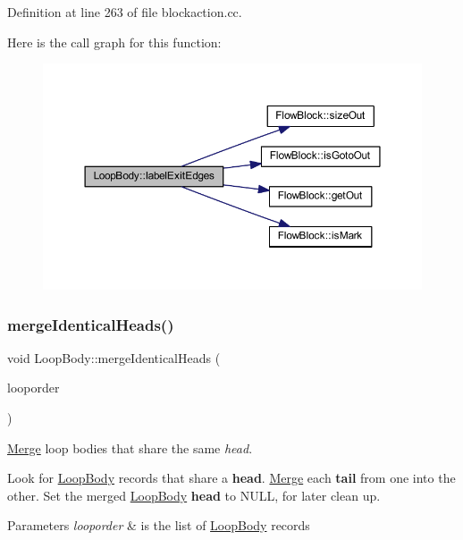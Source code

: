 Definition at line 263 of file blockaction.\+cc.

Here is the call graph for this function\+:
\nopagebreak
\begin{figure}[H]
\begin{center}
\leavevmode
\includegraphics[width=350pt]{class_loop_body_a7c3db3d0244209f2a200998b9a1b01cb_cgraph}
\end{center}
\end{figure}
\mbox{\label{class_loop_body_a4f29c37ed94852f51302cbd3c0a9f85c}} 
\subsubsection{\texorpdfstring{mergeIdenticalHeads()}{mergeIdenticalHeads()}}
{\footnotesize\ttfamily void Loop\+Body\+::merge\+Identical\+Heads (\begin{DoxyParamCaption}\item[{vector$<$ \mbox{\hyperlink{class_loop_body}{Loop\+Body}} $\ast$ $>$ \&}]{looporder }\end{DoxyParamCaption})\hspace{0.3cm}{\ttfamily [static]}}



\mbox{\hyperlink{class_merge}{Merge}} loop bodies that share the same {\itshape head}. 

Look for \mbox{\hyperlink{class_loop_body}{Loop\+Body}} records that share a {\bfseries{head}}. \mbox{\hyperlink{class_merge}{Merge}} each {\bfseries{tail}} from one into the other. Set the merged \mbox{\hyperlink{class_loop_body}{Loop\+Body}} {\bfseries{head}} to N\+U\+LL, for later clean up. 
\begin{DoxyParams}{Parameters}
{\em looporder} & is the list of \mbox{\hyperlink{class_loop_body}{Loop\+Body}} records \\
\hline
\end{DoxyParams}


